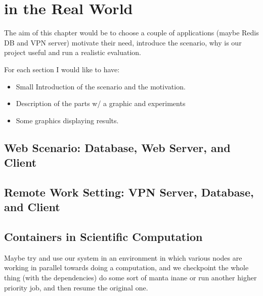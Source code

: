 \chapter{\projName in the Real World} \label{chap:applications}

The aim of this chapter would be to choose a couple of applications (maybe Redis DB and VPN server) motivate their need, introduce the scenario, why is our project useful and run a realistic evaluation.

For each section I would like to have:
\begin{itemize}
    \item Small Introduction of the scenario and the motivation.
    \item Description of the parts w/ a graphic and experiments
    \item Some graphics displaying results.
\end{itemize}


\section{Web Scenario: Database, Web Server, and Client}


\section{Remote Work Setting: VPN Server, Database, and Client}

\section{Containers in Scientific Computation}

Maybe try and use our system in an environment in which various nodes are working in parallel towards doing a computation, and we checkpoint the whole thing (with the dependencies) do some sort of manta inane or run another higher priority job, and then resume the original one.
